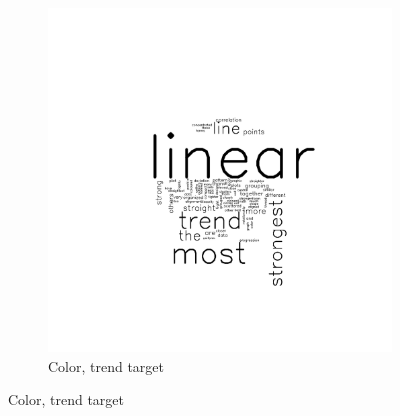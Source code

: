 \documentclass[11pt]{isuthesis}\usepackage[]{graphicx}\usepackage[]{color}
\begin{document}
\begin{figure}[ht]
\begin{subfigure}[t]{0.25\linewidth}
\end{subfigure}
\begin{subfigure}[t]{0.25\linewidth}
  \caption{Color, trend target}
  \includegraphics[width=\linewidth]{fig-sentiment-9}
\end{subfigure}


\end{figure}
\end{document}
